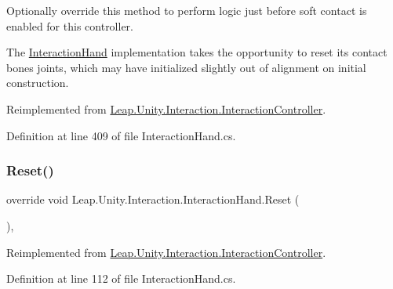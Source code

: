 Optionally override this method to perform logic just before soft contact is enabled for this controller. 

The \mbox{\hyperlink{class_leap_1_1_unity_1_1_interaction_1_1_interaction_hand}{Interaction\+Hand}} implementation takes the opportunity to reset its contact bone\textquotesingle{}s joints, which may have initialized slightly out of alignment on initial construction. 

Reimplemented from \mbox{\hyperlink{class_leap_1_1_unity_1_1_interaction_1_1_interaction_controller_ae5952ec4f81442c19ecb558bbcfebaa2}{Leap.\+Unity.\+Interaction.\+Interaction\+Controller}}.



Definition at line 409 of file Interaction\+Hand.\+cs.

\mbox{\label{class_leap_1_1_unity_1_1_interaction_1_1_interaction_hand_abce682528cf0c3d2bd353c3ed86e72e5}} 
\subsubsection{\texorpdfstring{Reset()}{Reset()}}
{\footnotesize\ttfamily override void Leap.\+Unity.\+Interaction.\+Interaction\+Hand.\+Reset (\begin{DoxyParamCaption}{ }\end{DoxyParamCaption})\hspace{0.3cm}{\ttfamily [protected]}, {\ttfamily [virtual]}}



Reimplemented from \mbox{\hyperlink{class_leap_1_1_unity_1_1_interaction_1_1_interaction_controller_a593d87fbcfe464b2308a56a60b4796d5}{Leap.\+Unity.\+Interaction.\+Interaction\+Controller}}.



Definition at line 112 of file Interaction\+Hand.\+cs.

\mbox{\label{class_leap_1_1_unity_1_1_interaction_1_1_interaction_hand_a83cd2a6e82f7213b6dc2f17667c6389d}} 
